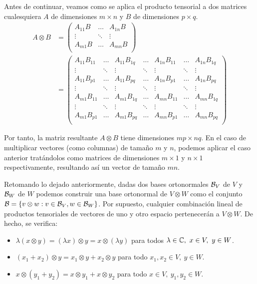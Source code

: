 Antes de continuar, veamos como se aplica el producto tensorial a dos matrices cualesquiera $A$ de dimensiones $m\times n$ y $B$ de dimensiones $p\times q$.
\begin{equation}
\begin{aligned}
A\otimes B&=
\left(\begin{matrix}
A_{11}B & \hdots & A_{1n}B \\
\vdots & \ddots & \vdots \\
A_{m1}B & \hdots & A_{mn}B \\
\end{matrix}\right)\\
&=
\left(\begin{matrix}
A_{11}B_{11} & \hdots & A_{11}B_{1q} & \hdots & A_{1n}B_{11} & \hdots & A_{1n}B_{1q} \\
\vdots & \ddots & \vdots & \ddots & \vdots & \ddots & \vdots \\
A_{11}B_{p1} & \hdots & A_{11}B_{pq} & \hdots & A_{1n}B_{p1} & \hdots & A_{1n}B_{pq} \\
\vdots & \ddots & \vdots & \ddots & \vdots & \ddots & \vdots \\
A_{m1}B_{11} & \hdots & A_{m1}B_{1q} & \hdots & A_{mn}B_{11} & \hdots & A_{mn}B_{1q} \\
\vdots & \ddots & \vdots & \ddots & \vdots & \ddots & \vdots \\
A_{m1}B_{p1} & \hdots & A_{m1}B_{pq} & \hdots & A_{mn}B_{p1} & \hdots & A_{mn}B_{pq} \\
\end{matrix}\right)
\end{aligned}
\end{equation}

Por tanto, la matriz resultante $A\otimes B$ tiene dimensiones $mp\times nq$. En el caso de multiplicar vectores (como columnas) de tamaño $m$ y $n$, podemos aplicar el caso anterior tratándolos como matrices de dimensiones $m\times 1$ y $n\times 1$ respectivamente, resultando así un vector de tamaño $mn$.

Retomando lo dejado anteriormente, dadas dos bases ortonormales $\mathcal{B}_V$ de $V$ y $\mathcal{B}_W$ de $W$ podemos construir una base ortonormal de $V\otimes W$ como el conjunto $\mathcal{B}=\{v\otimes w:v\in\mathcal{B}_V,w\in\mathcal{B}_W\}$. Por supuesto, cualquier combinación lineal de productos tensoriales de vectores de uno y otro espacio pertenecerán a $V\otimes W$. De hecho, se verifica:

\begin{itemize}
\item $\lambda (x\otimes y) = (\lambda x)\otimes y = x\otimes(\lambda y)$ para todos $\lambda\in\mathbb{C},\ x\in V,\ y\in W$.
\item $(x_1+x_2)\otimes y = x_1\otimes y+x_2\otimes y$ para todo $x_1,x_2\in V,\ y\in W$.
\item $x \otimes(y_1 + y_2)= x\otimes y_1 + x\otimes y_2$ para todo $x\in V,\ y_1,y_2\in W$.
\end{itemize}

